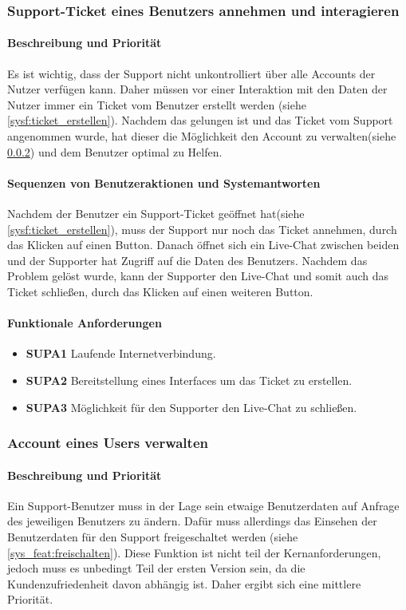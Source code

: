 \subsubsection{Support-Ticket eines Benutzers annehmen und \label{sysf:ticket_annehmen}
interagieren}
\paragraph{Beschreibung und Priorität}
Es ist wichtig, dass der Support nicht unkontrolliert über alle Accounts der Nutzer verfügen kann. Daher müssen vor einer Interaktion mit den Daten der Nutzer immer ein Ticket vom Benutzer erstellt werden (siehe \ref{sysf:ticket_erstellen}).
Nachdem das gelungen ist und das Ticket vom Support angenommen wurde, hat dieser die Möglichkeit den Account zu verwalten(siehe \ref{sysf:support_account_verwalten}) und dem Benutzer optimal zu Helfen.
\paragraph{Sequenzen von Benutzeraktionen und Systemantworten}
Nachdem der Benutzer ein Support-Ticket geöffnet hat(siehe \ref{sysf:ticket_erstellen}), muss der Support nur noch das Ticket annehmen, durch das Klicken auf einen Button. Danach öffnet sich ein Live-Chat zwischen beiden und der Supporter hat Zugriff auf die Daten des Benutzers. Nachdem das Problem gelöst wurde, kann der Supporter den Live-Chat und somit auch das Ticket schließen, durch das Klicken auf einen weiteren Button.
\paragraph{Funktionale Anforderungen}
\begin{itemize}
	\item \textbf{SUPA1} Laufende Internetverbindung.
	\item \textbf{SUPA2} Bereitstellung eines Interfaces um das Ticket zu erstellen.
	\item \textbf{SUPA3} Möglichkeit für den Supporter den Live-Chat zu schließen. 
\end{itemize}

\subsubsection{Account eines Users verwalten}
\label{sysf:support_account_verwalten}
\paragraph{Beschreibung und Priorität}
Ein Support-Benutzer muss in der Lage sein etwaige Benutzerdaten auf Anfrage des jeweiligen Benutzers zu ändern. Dafür muss allerdings das Einsehen der Benutzerdaten für den Support freigeschaltet werden (siehe \ref{sys_feat:freischalten}). Diese Funktion ist nicht teil der Kernanforderungen, jedoch muss es unbedingt Teil der ersten Version sein, da die Kundenzufriedenheit davon abhängig ist. Daher ergibt sich eine mittlere Priorität.

